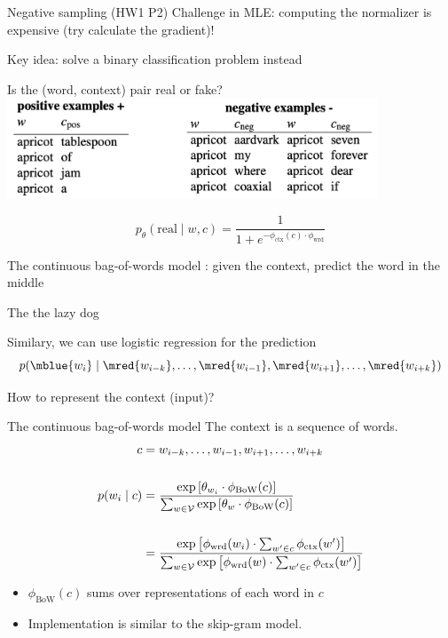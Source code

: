 \documentclass[usenames,dvipsnames,notes,11pt,aspectratio=169]{beamer}
\begin{document}
\begin{frame}
    {Negative sampling (HW1 P2)}
    Challenge in MLE: computing the normalizer is expensive (try calculate the gradient)!

    Key idea: solve a binary classification problem instead
    \begin{center}
        Is the (word, context) pair real or fake? \\
        \includegraphics[height=3cm]{figures/neg-sample}
    \end{center}
    $$
    p_\theta(\text{real} \mid w, c) = \frac{1}{1+e^{-\phi_{\text{ctx}}(c)\cdot\phi_{\text{wrd}}}}
    $$
\end{frame}

\begin{frame}
    {The continuous bag-of-words model}
    : given the context, predict the word in the middle 
    \begin{center}
        The      the lazy dog
    \end{center}

    Similary, we can use logistic regression for the prediction
    $$
    p(\mblue{w_i} \mid \mred{w_{i-k}}, \ldots, \mred{w_{i-1}}, \mred{w_{i+1}}, \ldots, \mred{w_{i+k}})
    $$

    How to represent the context (input)? 
\end{frame}

\begin{frame}
    {The continuous bag-of-words model}
    The context is a sequence of words.
    \begin{align*}
        c &= w_{i-k}, \ldots, w_{i-1}, w_{i+1}, \ldots, w_{i+k} \\\\
        p(w_i\mid c) &= \frac{\exp\left[ \theta_{w_i}\cdot \phi_{\text{BoW}}(c) \right]}
        {\sum_{w\in\mathcal{V}} \exp\left[ \theta_{w}\cdot\phi_{\text{BoW}}(c) \right]} \\\\
        &= \frac{\exp\left[ \phi_{\text{wrd}}(w_i)\cdot \sum_{w'\in c}\phi_{\text{ctx}}(w') \right]}
        {\sum_{w\in\mathcal{V}} \exp\left[ \phi_{\text{wrd}}(w)\cdot\sum_{w'\in c}\phi_{\text{ctx}}(w') \right]} \\
    \end{align*}

    \begin{itemize}
        \item $\phi_{\text{BoW}}(c)$ sums over representations of each word in $c$
        \item Implementation is similar to the skip-gram model.
    \end{itemize}
\end{frame}
\end{document}
